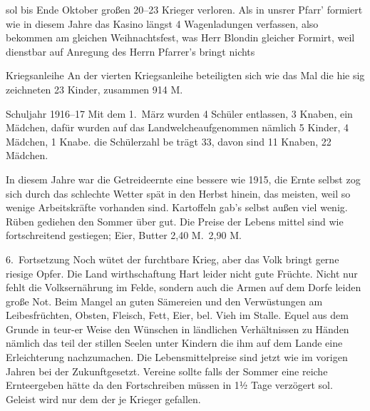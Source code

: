 

sol bis Ende Oktober großen 20–23 Krieger verloren.  Als in unsrer\ob
Pfarr' formiert wie in diesem Jahre das Kasino längst 4 Wagenladungen\unsicher\ob
verfassen, also bekommen am gleichen Weihnachtsfest, was Herr Blond\unsicher in\ob
gleicher Formirt, weil dienstbar auf Anregung des Herrn Pfarrer's bringt nichts

Kriegsanleihe\ob
An der vierten Kriegsanleihe beteiligten sich wie das Mal die hie\ohb
sig zeichneten 23 Kinder, zusammen 914 M.

Schuljahr 1916–17\ob
Mit dem 1.\ März wurden 4 Schüler entlassen, 3 Knaben, ein\ob
Mädchen, dafür wurden auf das Landwelche\unsicher aufgenommen\ob
nämlich 5 Kinder, 4 Mädchen, 1 Knabe. die Schülerzahl be\ohb
trägt 33, davon sind 11 Knaben, 22 Mädchen.

\pend
{}
\pstart

In diesem Jahre war die Getreideernte eine bessere wie 1915, die Ernte\ob
selbst zog sich durch das schlechte Wetter spät in den Herbst hinein, das\ob
meisten, weil so wenige Arbeitskräfte vorhanden sind. Kartoffeln gab's selbst\ob
außen viel wenig. Rüben gediehen den Sommer über gut. Die Preise der Lebens\ohb
mittel sind wie fortschreitend gestiegen; Eier, Butter 2,40 M.\ 2,90 M.

6.\ Fortsetzung\ob
Noch wütet der furchtbare Krieg, aber das Volk bringt gerne riesige Opfer. Die Land\ohb
wirthschaftung Hart leider nicht gute Früchte. Nicht nur fehlt die Volksernährung im Felde, sondern\ob
auch die Armen auf dem Dorfe leiden große Not. Beim Mangel an guten Sämereien und\ob
den Verwüstungen am Leibesfrüchten, Obsten, Fleisch, Fett, Eier, bel\unsicher. Vieh im Stalle. Equel\unsicher\ob
aus dem Grunde in teur-er Weise den Wünschen in ländlichen Verhältnissen zu Händen\ob
nämlich das teil der stillen Seelen unter Kindern die ihm auf dem Lande eine\ob
Erleichterung\unsicher{} nachzumachen. Die Lebensmittelpreise sind jetzt wie im vorigen Jahren bei\ob
der Zukunft\unsicher gesetzt. Vereine sollte falls der Sommer eine reiche Ernte\unsicher ergeben hätte da\ohb
den Fortschreiben müssen in 1½ Tage verzögert sol. Geleist wird nur dem der je\unsicher\ob
Krieger gefallen.
\pend
